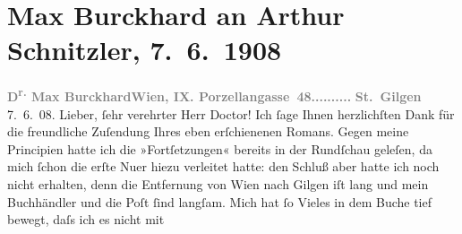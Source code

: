 

         
         \newcommand{\erwaehntePersonen}{Personen: Olga Schnitzler}
         \newcommand{\erwaehnteInstitutionen}{}
         \newcommand{\erwaehnteOrte}{Orte: Porzellangasse, St. Gilgen, Wien}
         \newcommand{\erwaehnteWerke}{Werke: Der Weg ins Freie. Roman, Die neue Rundschau}
               \section[Max Burckhard an Arthur Schnitzler, 7. 6. 1908]{ Max Burckhard an Arthur Schnitzler, 7. 6. 1908}\nopagebreak{}\rehead{ }\begin{ledgroupsized}[t]{13cm}\normalsize\beginnumbering \toendnotes[C]{\smallbreak\pagebreak[2]} 
\toendnotes[C]{\smallbreak}\pstart
           \noindent{}{\pb}\textcolor{gray}{\textbf{D\textsuperscript{r.} Max Burckhard}}\hfill \textcolor{gray}{\textbf{Wien, IX. Porzellangasse 48..........}}\pend
           \pstart
           \raggedleft{}\textcolor{gray}{\textbf{St. Gilgen}}{ }7. 6. 08.\pend
           \pstart{}Lieber, ſehr verehrter Herr Doctor!\pend\pstart
           Ich ſage Ihnen herzlichſten Dank für die freundliche Zuſendung Ihres eben
                    erſchienenen Romans. Gegen
                    meine Principien hatte ich die »Fortſetzungen« bereits in der Rundſchau geleſen, da mich ſchon die erſte Nu{\geminationm}er hiezu verleitet hatte: den Schluß aber hatte
                    ich noch nicht erhalten, denn die Entfernung von Wien nach Gilgen iſt lang und mein
                    Buchhändler und die Poſt ſind langſam. Mich hat ſo Vieles in dem Buche tief bewegt, daſs ich es nicht mit

\end{ledgroupsized}
